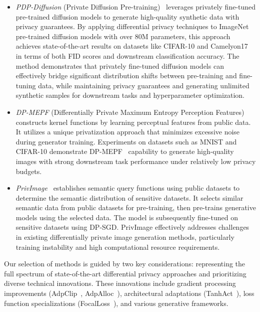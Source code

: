 \documentclass{article}
\begin{document}
\begin{itemize}[leftmargin=*]
    \item \textit{PDP-Diffusion} (Private Diffusion Pre-training)~\cite{ghalebikesabi2023differentially} leverages privately fine-tuned pre-trained diffusion models to generate high-quality synthetic data with privacy guarantees. By applying differential privacy techniques to ImageNet pre-trained diffusion models with over 80M parameters, this approach achieves state-of-the-art results on datasets like CIFAR-10 and Camelyon17 in terms of both FID scores and downstream classification accuracy. The method demonstrates that privately fine-tuned diffusion models can effectively bridge significant distribution shifts between pre-training and fine-tuning data, while maintaining privacy guarantees and generating unlimited synthetic samples for downstream tasks and hyperparameter optimization.
   
    \item \textit{DP-MEPF} (Differentially Private Maximum Entropy Perception Features)~\cite{harder2022pre} constructs kernel functions by learning perceptual features from public data. It utilizes a unique privatization approach that minimizes excessive noise during generator training. Experiments on datasets such as MNIST and CIFAR-10 demonstrate DP-MEPF~\cite{harder2022pre} capability to generate high-quality images with strong downstream task performance under relatively low privacy budgets.
    
    \item \textit{PrivImage~\cite{li2023meticulously}} establishes semantic query functions using public datasets to determine the semantic distribution of sensitive datasets. It selects similar semantic data from public datasets for pre-training, then pre-trains generative models using the selected data. The model is subsequently fine-tuned on sensitive datasets using DP-SGD\cite{abadi2016deep}. PrivImage\cite{li2023meticulously} effectively addresses challenges in existing differentially private image generation methods, particularly training instability and high computational resource requirements.
    
\end{itemize}


Our selection of methods is guided by two key considerations: representing the full spectrum of state-of-the-art differential privacy approaches and prioritizing diverse technical innovations. These innovations include gradient processing improvements (AdpClip~\cite{andrew2021differentially}, AdpAlloc~\cite{yu2019differentially}), architectural adaptations (TanhAct~\cite{papernot2021tempered}), loss function specializations (FocalLoss~\cite{shamsabadi2023losing}), and various generative frameworks. 
\end{document}
